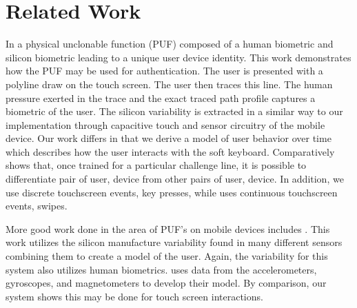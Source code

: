 \section{Related Work}
\label{related_work}
In \cite{ScheelTyagi15}
a physical unclonable function (PUF) composed of
a human biometric and silicon biometric
leading to a unique user device identity.
This work demonstrates how the PUF may be used
for authentication.
%
The user is presented with a polyline draw on the touch screen.
The user then traces this line.
The human pressure exerted in the trace and
the exact traced path profile captures
a biometric of the user.
%
The silicon variability is extracted
in a similar way to our implementation
through capacitive touch and sensor circuitry
of the mobile device.
%
Our work differs in that
we derive a model of user behavior over time
which describes how the user
interacts with the soft keyboard.
Comparatively \cite{ScheelTyagi15} shows
that, once trained for a particular challenge line,
it is possible to differentiate pair of user, device from
other pairs of user, device.
%
In addition,
we use discrete touchscreen events, key presses, while 
\cite{ScheelTyagi15} uses continuous touchscreen events, swipes.

More good work done in the area of
PUF's on mobile devices includes \cite{sensec13}.
%
This work utilizes the silicon manufacture variability 
found in many different sensors
combining them to create a model of the user.
Again, the variability for this system also
utilizes human biometrics.
%
\cite{sensec13} uses data from
the accelerometers, gyroscopes, and magnetometers
to develop their model.
By comparison,
our system shows this may be done for touch screen interactions.
%
%

